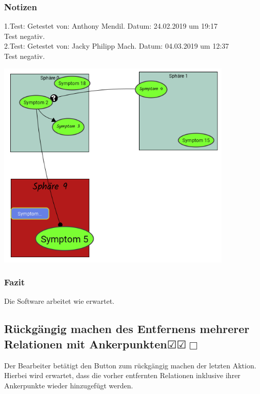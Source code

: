 \documentclass[enabledeprecatedfontcommands]{scrartcl}
\newcommand{\subsectiont}[2]{\subsection[#1]{#1{\normalsize\normalfont #2}}}
\newcommand{\leer}{$\Box$}
\newcommand{\ok}{$\CheckedBox$}
\begin{document}
\subsubsection{Notizen}
1.Test: Getestet von: Anthony Mendil. Datum: 24.02.2019 um 19:17 \\
Test negativ. \\
2.Test: Getestet von: Jacky Philipp Mach. Datum: 04.03.2019 um 12:37 \\
Test negativ.
\begin{center}
\includegraphics[height=10cm]{3_40.PNG}
\end{center}
\subsubsection{Fazit}
Die Software arbeitet wie erwartet.

\subsectiont{Rückgängig machen des Entfernens mehrerer Relationen mit Ankerpunkten}{\dotfill\ok\ok\leer}
Der Bearbeiter betätigt den Button zum rückgängig machen der letzten Aktion. Hierbei wird erwartet, dass die vorher entfernten Relationen inklusive ihrer Ankerpunkte wieder hinzugefügt werden.
\end{document}
